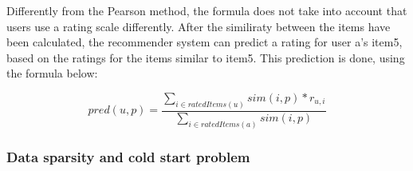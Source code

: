 Differently from the Pearson method, the formula does not take into account that users use a rating scale differently. 
After the similiraty between the items have been calculated, the recommender system can predict a rating for user a's item5, based on the ratings for the items similar to item5. This prediction is done, using the formula below:

\[
	pred(u,p) = \frac{\sum_{i\in ratedItems(u)} sim(i,p) * r_{u,i}}{\sum_{i \in ratedItems(a)} sim(i,p)}
\]

\subsubsection{Data sparsity and cold start problem}
